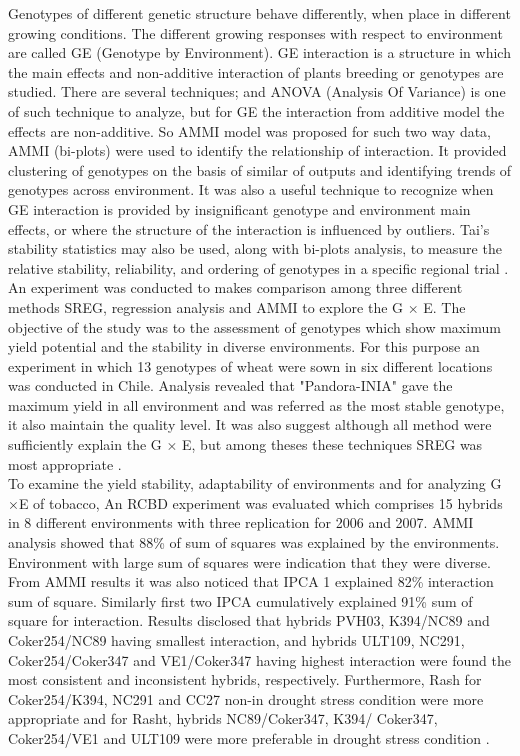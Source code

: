  Genotypes of different genetic structure behave differently, when place in different growing conditions. The different growing responses with respect to environment are called GE (Genotype by Environment). GE interaction is a structure in which the main effects and non-additive interaction of plants breeding or genotypes are studied. There are several techniques; and ANOVA (Analysis Of Variance) is one of such technique to analyze, but for GE the interaction from additive model the effects are non-additive. So AMMI model was proposed for such two way data, AMMI (bi-plots) were used to identify the relationship of interaction. It provided clustering of genotypes on the basis of similar of outputs and identifying trends of genotypes across environment. It was also a useful technique to recognize when GE interaction is provided by insignificant genotype and environment main effects, or where the structure of the interaction is influenced by outliers.  Tai's stability statistics may also be used, along with bi-plots analysis, to measure the relative stability, reliability, and ordering of genotypes in a specific regional trial \citep{Shafii1998}.\\

 An experiment was conducted to makes comparison among three different methods SREG, regression analysis and AMMI to explore the G $\times$ E. The objective of the study was to the assessment of genotypes which show maximum yield potential and the stability in diverse environments. For this purpose an experiment in which 13 genotypes of wheat were sown in six different locations was conducted in Chile. Analysis revealed that "Pandora-INIA" gave the maximum yield in all environment and was referred as the most stable genotype, it also maintain the quality level. It was also suggest although all method were sufficiently explain the G $\times$ E, but among theses these techniques SREG was most appropriate \citep{Castillo2012}. \\

To examine the yield stability, adaptability of environments and for analyzing G$\times$E of tobacco, An RCBD experiment was evaluated which comprises 15 hybrids in 8 different environments with three replication for 2006 and 2007. AMMI analysis showed that 88\% of sum of squares was explained by the environments. Environment with large sum of squares were indication that they were diverse. From AMMI results it was also noticed that IPCA 1 explained 82\% interaction sum of square. Similarly first two IPCA cumulatively explained 91\% sum of square for interaction. Results disclosed that hybrids PVH03, K394/NC89 and Coker254/NC89 having smallest interaction, and hybrids ULT109, NC291, Coker254/Coker347 and VE1/Coker347 having highest interaction were  found the most consistent and inconsistent hybrids, respectively. Furthermore,  Rash for Coker254/K394, NC291 and CC27 non-in drought stress condition were more appropriate and for Rasht, hybrids NC89/Coker347, K394/ Coker347, Coker254/VE1 and ULT109 were more preferable in drought stress condition \citep{Sadeghi2011}.\\ 

